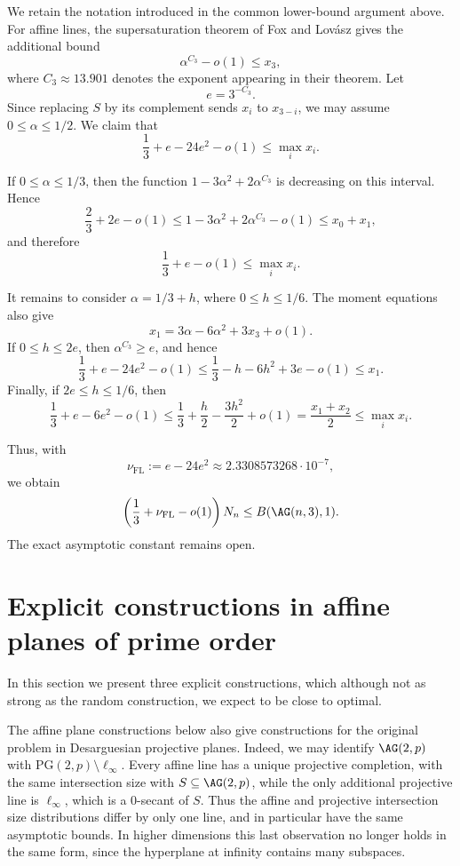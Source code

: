 \documentclass[10pt]{article}
\newcommand{\PG}{\mathrm{PG}}
\theoremstyle{definition}
\begin{document}
	{We retain the notation introduced in the common lower-bound argument
		above. For affine lines, the supersaturation theorem of Fox and Lovász
		\cite[Theorem~3]{FoxLovaszATR} gives the additional bound
		\[
		\alpha^{C_3}-o(1)\leq x_3,
		\]
		where \(C_3\approx13.901\) denotes the exponent appearing in their
		theorem. Let
		\[
		e=3^{-C_3}.
		\]
		Since replacing \(S\) by its complement sends \(x_i\) to \(x_{3-i}\),
		we may assume \(0\leq\alpha\leq1/2\). We claim that
		\[
		\frac13+e-24e^2-o(1)\leq\max_i x_i.
		\]
		
		If \(0\leq\alpha\leq1/3\), then the function
		\(1-3\alpha^2+2\alpha^{C_3}\) is decreasing on this interval. Hence
		\[
		\frac23+2e-o(1)
		\leq1-3\alpha^2+2\alpha^{C_3}-o(1)
		\leq x_0+x_1,
		\]
		and therefore
		\[
		\frac13+e-o(1)\leq\max_i x_i.
		\]
		
		It remains to consider \(\alpha=1/3+h\), where
		\(0\leq h\leq1/6\). The moment equations also give
		\[
		x_1=3\alpha-6\alpha^2+3x_3+o(1).
		\]
		If \(0\leq h\leq2e\), then \(\alpha^{C_3}\geq e\), and hence
		\[
		\frac13+e-24e^2-o(1)
		\leq\frac13-h-6h^2+3e-o(1)
		\leq x_1.
		\]
		Finally, if \(2e\leq h\leq1/6\), then
		\[
		\frac13+e-6e^2-o(1)
		\leq\frac13+\frac h2-\frac{3h^2}{2}+o(1)
		=\frac{x_1+x_2}{2}
		\leq\max_i x_i.
		\]
		
		Thus, with
		\[
		\nu_{\mathrm{FL}}
		:=e-24e^2
		\approx2.3308573268\cdot10^{-7},
		\]
		we obtain
		\[
		\left(\frac13+\nu_{\mathrm{FL}}-o(1)\right)N_n
		\leq B(\AG(n,3),1).
		\]
		The exact asymptotic constant remains open.}
	
	\section[Explicit constructions in affine planes of prime order] {Explicit constructions in affine planes of prime order}
	\label{sec:constructions in affine planes}
	
	In this section we present three explicit constructions, which  although not as strong as the random construction, we expect to be close to optimal.
	
	The affine plane constructions below also give constructions for the original problem in Desarguesian projective planes. Indeed, we may identify \(\AG(2,p)\) with \(\PG(2,p)\setminus\ell_\infty\). Every affine line has a unique projective completion, with the same intersection size with \(S\subseteq\AG(2,p)\), while the only additional projective line is \(\ell_\infty\), which is a \(0\)-secant of \(S\). Thus the affine and projective intersection size distributions differ by only one line, and in particular have the same asymptotic bounds. In higher dimensions this last observation no longer holds in the same form, since the hyperplane at infinity contains many subspaces.
	
\end{document}
